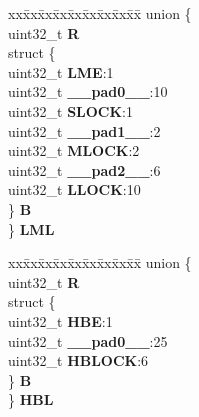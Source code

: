 \begin{DoxyCompactItemize}
\begin{tabbing}
\end{tabbing}\item 
\mbox{\label{structFLASH__tag_a35ed80ecd834abf3ac82b6c8479fb2aa}} 
\begin{tabbing}
xx\=xx\=xx\=xx\=xx\=xx\=xx\=xx\=xx\=\kill
union \{\\
\>uint32\_t {\bfseries R}\\
\>struct \{\\
\>\>uint32\_t {\bfseries LME}:1\\
\>\>uint32\_t {\bfseries \_\_pad0\_\_}:10\\
\>\>uint32\_t {\bfseries SLOCK}:1\\
\>\>uint32\_t {\bfseries \_\_pad1\_\_}:2\\
\>\>uint32\_t {\bfseries MLOCK}:2\\
\>\>uint32\_t {\bfseries \_\_pad2\_\_}:6\\
\>\>uint32\_t {\bfseries LLOCK}:10\\
\>\} {\bfseries B}\\
\} {\bfseries LML}\\

\end{tabbing}\item 
\mbox{\label{structFLASH__tag_a98526f0a938e7037cb5d630a947a6392}} 
\begin{tabbing}
xx\=xx\=xx\=xx\=xx\=xx\=xx\=xx\=xx\=\kill
union \{\\
\>uint32\_t {\bfseries R}\\
\>struct \{\\
\>\>uint32\_t {\bfseries HBE}:1\\
\>\>uint32\_t {\bfseries \_\_pad0\_\_}:25\\
\>\>uint32\_t {\bfseries HBLOCK}:6\\
\>\} {\bfseries B}\\
\} {\bfseries HBL}\\


\end{tabbing}
\end{DoxyCompactItemize}
